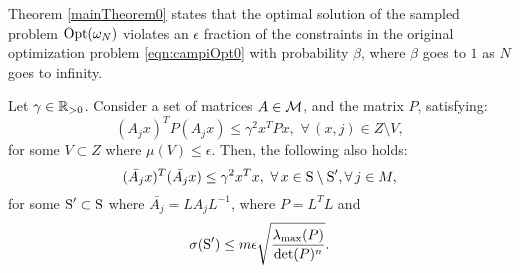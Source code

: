 Theorem \ref{mainTheorem0} states that the optimal solution of the sampled problem $\text{Opt}(\omega_N)$ violates an $\epsilon$ fraction of the constraints in the original optimization problem  \eqref{eqn:campiOpt0} with probability $\beta$, where $\beta$ goes to $1$ as $N$ goes to infinity.



\begin{theorem}\label{thm:mainTheorem01}Let $\gamma \in \mathbb{R}_{> 0}$. Consider a set of matrices $A \in \mathcal{M}$, and the matrix $P$, satisfying:
\begin{equation}\label{eqn:P}(A_j x)^TP(A_j x) \leq {\gamma}^2x^TPx,\,\, \forall\, (x, j) \in Z \setminus V,\end{equation}
for some $V \subset Z$ where $\mu(V) \leq \epsilon$. Then, the following also holds:
\begin{equation*}\label{eqn:thm01-2}(\bar{A_j} x)^T(\bar{A_j} x) \leq {\gamma}^2x^Tx,\,\, \forall\, x \in \text{S} \setminus \text{S}', \forall\, j \in M,\end{equation*}
for some $\text{S}' \subset \text{S}$ where $\bar{A_j} = LA_jL^{-1}$, where $P= L^TL$ and $$\sigma(\text{S}') \leq m\epsilon \sqrt{\frac{\lambda_{\max}(P)}{\det(P)^n}}.$$
\end{theorem}

